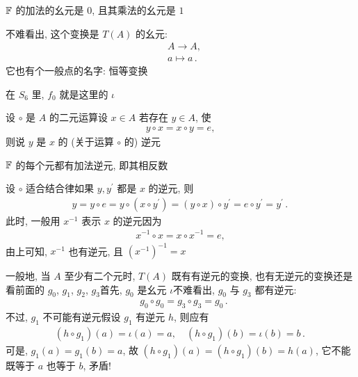 \begin{example}
    $\mathbb{F}$ 的加法的幺元是 $0$, 且其乘法的幺元是 $1$\period
\end{example}

\begin{example}
    不难看出, 这个变换是 $T(A)$ 的幺元:
    \begin{align*}
         & A \to A,  \tag*{$\iota$:} \\
         & a \mapsto a \period
    \end{align*}
    它也有个一般点的名字: 恒等变换 \period

    在 $S_6$ 里, $f_0$ 就是这里的 $\iota$\period
\end{example}

\begin{definition}
    设 $\circ$ 是 $A$ 的二元运算\period 设 $x \in A$ 若存在 $y \in A$, 使
    \begin{align*}
        y \circ x = x \circ y = e,
    \end{align*}
    则说 $y$ 是 $x$ 的 (关于运算 $\circ$ 的) 逆元 \period
\end{definition}

\begin{example}
    $\mathbb{F}$ 的每个元都有加法逆元, 即其相反数\period
\end{example}

\begin{remark}
    设 $\circ$ 适合结合律\period 如果 $y, y^{\prime}$ 都是 $x$ 的逆元, 则
    \begin{align*}
        y = y \circ e = y \circ (x \circ y^{\prime}) = (y \circ x) \circ y^{\prime} = e \circ y^{\prime} = y^{\prime} \period
    \end{align*}
    此时, 一般用 $x^{-1}$ 表示 $x$ 的逆元\period 因为
    \begin{align*}
        x^{-1} \circ x = x \circ x^{-1} = e,
    \end{align*}
    由上可知, $x^{-1}$ 也有逆元, 且 $(x^{-1})^{-1} = x$\period
\end{remark}

\begin{example}
    一般地, 当 $A$ 至少有二个元时, $T(A)$ 既有有逆元的变换, 也有无逆元的变换\period 还是看前面的 $g_0$, $g_1$, $g_2$, $g_3$\period 首先, $g_0$ 是幺元 $\iota$\period 不难看出, $g_0$ 与 $g_3$ 都有逆元:
    \begin{align*}
         & g_0 \circ g_0 = g_3 \circ g_3 = g_0 \period
    \end{align*}
    不过, $g_1$ 不可能有逆元\period 假设 $g_1$ 有逆元 $h$, 则应有
    \begin{align*}
        (h \circ g_1)(a) = \iota(a) = a, \quad (h \circ g_1)(b) = \iota(b) = b \period
    \end{align*}
    可是, $g_1(a) = g_1(b) = a$, 故 $(h \circ g_1)(a) = (h \circ g_1)(b) = h(a)$, 它不能既等于 $a$ 也等于 $b$, 矛盾!
\end{example}


